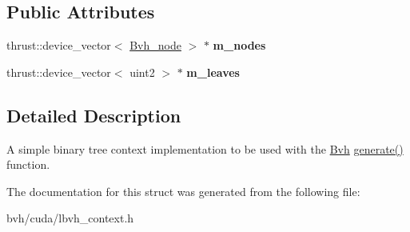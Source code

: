 \subsection*{\-Public \-Attributes}
\begin{DoxyCompactItemize}
\item 
\hypertarget{structnih_1_1cuda_1_1_l_b_v_h__context_a2d63b0fd570598396a3889df1cb222c9}{
thrust\-::device\-\_\-vector$<$ \hyperlink{structnih_1_1_bvh__node}{\-Bvh\-\_\-node} $>$ $\ast$ {\bfseries m\-\_\-nodes}}
\label{structnih_1_1cuda_1_1_l_b_v_h__context_a2d63b0fd570598396a3889df1cb222c9}

\item 
\hypertarget{structnih_1_1cuda_1_1_l_b_v_h__context_ac24338e22f4620f7fc7e3d5271652b9d}{
thrust\-::device\-\_\-vector$<$ uint2 $>$ $\ast$ {\bfseries m\-\_\-leaves}}
\label{structnih_1_1cuda_1_1_l_b_v_h__context_ac24338e22f4620f7fc7e3d5271652b9d}

\end{DoxyCompactItemize}


\subsection{\-Detailed \-Description}
\-A simple binary tree context implementation to be used with the \hyperlink{structnih_1_1_bvh}{\-Bvh} \hyperlink{group__bintree_gad76a50ae08ab4d525f748a7cbcc0fb6e}{generate()} function. 

\-The documentation for this struct was generated from the following file\-:\begin{DoxyCompactItemize}
\item 
bvh/cuda/lbvh\-\_\-context.\-h\end{DoxyCompactItemize}
